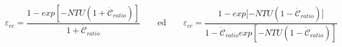 \documentclass[a4paper,10pt]{article}                                                                                       %
\begin{document}
\begin{equation}                                                                                                            %
  \varepsilon_{ec} = \frac{1-exp{[-NTU(1+\mathcal{\dot{C}}_{ratio})]}}{1+\mathcal{\dot{C}}_{ratio}}                         %
  \qquad\text{ed}\qquad                                                                                                     %
  \varepsilon_{cc} = \frac{1-exp{[-NTU(1-\mathcal{\dot{C}}_{ratio})}]}                                                      %
  {1-\mathcal{\dot{C}}_{ratio}exp{[-NTU(1-\mathcal{\dot{C}}_{ratio})]}}                                                     %
  \label{eqn:epsilon}                                                                                                       %
\end{equation}                                                                                                              %
\end{document}
